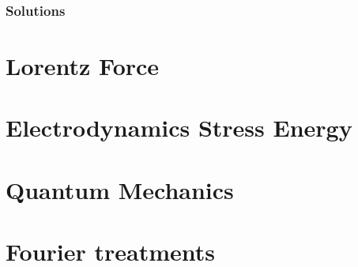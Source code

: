      \section{Solutions}
         \shipoutAnswer

\part{Lorentz Force}
   
   
   
   
   

\part{Electrodynamics Stress Energy}
   
   
   
   
   
   
   
   
   
   
   

\part{Quantum Mechanics}
   
   
   
   
   
   
   
   

\part{Fourier treatments}
   
   
   
   
   
   
   
   
   
%
%
